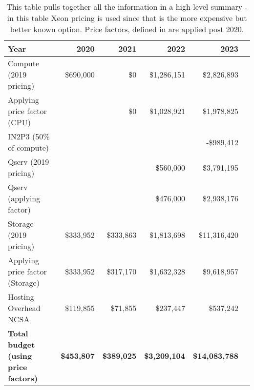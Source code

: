 \tiny \begin{longtable} { |p{}  |r  |r  |r  |r  |r |} 
\caption{This table pulls together all the information in a high level summary - in this table Xeon pricing is used since that is the more expensive but better known option. Price factors, defined in  are applied post 2020.
 \label{tab:Summary}}\\ 
\hline 
\textbf{Year}&\textbf{2020}&\textbf{2021}&\textbf{2022}&\textbf{2023} \\ \hline
{Compute (2019 pricing)}&{\$690,000}&{\$0}&{\$1,286,151}&{\$2,826,893} \\ \hline
{Applying price factor (CPU)}&{}&{\$0}&{\$1,028,921}&{\$1,978,825} \\ \hline
{IN2P3 (50\% of compute)}&{}&{}&{}&{-\$989,412} \\ \hline
{Qserv (2019 pricing)}&{}&{}&{\$560,000}&{\$3,791,195} \\ \hline
{Qserv (applying factor)}&{}&{}&{\$476,000}&{\$2,938,176} \\ \hline
{Storage (2019 pricing)}&{\$333,952}&{\$333,863}&{\$1,813,698}&{\$11,316,420} \\ \hline
{Applying price factor (Storage)}&{\$333,952}&{\$317,170}&{\$1,632,328}&{\$9,618,957} \\ \hline
{Hosting Overhead NCSA
}&{\$119,855}&{\$71,855}&{\$237,447}&{\$537,242} \\ \hline
\textbf{Total budget (using price factors)}&\textbf{\$453,807}&\textbf{\$389,025}&\textbf{\$3,209,104}&\textbf{\$14,083,788} \\ \hline
\end{longtable} \normalsize
